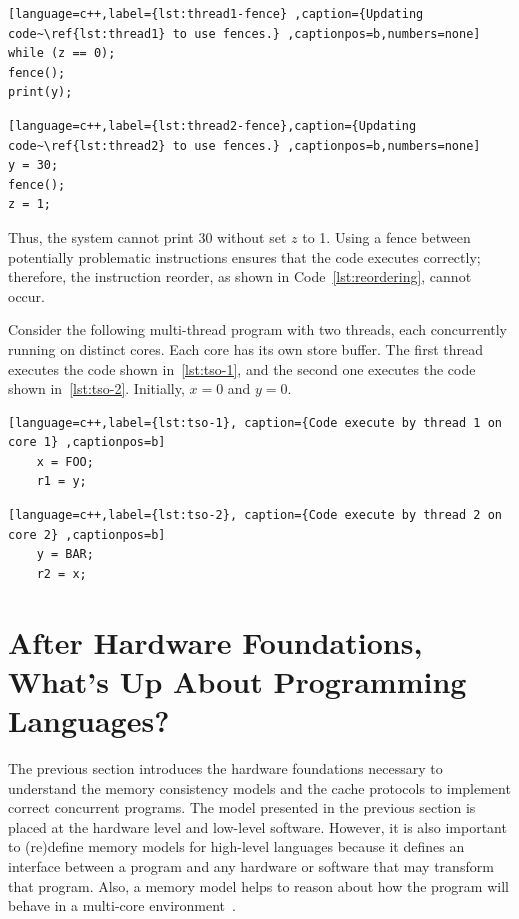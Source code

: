 \begin{example}
\begin{lstlisting}[language=c++,label={lst:thread1-fence} ,caption={Updating code~\ref{lst:thread1} to use fences.} ,captionpos=b,numbers=none]
while (z == 0);
fence();
print(y);
\end{lstlisting}

\begin{lstlisting}[language=c++,label={lst:thread2-fence},caption={Updating code~\ref{lst:thread2} to use fences.} ,captionpos=b,numbers=none]
y = 30;
fence();
z = 1;
\end{lstlisting}

Thus, the system cannot print 30 without set \(z\) to 1. Using a fence between potentially problematic instructions ensures that the code executes correctly; therefore, the instruction reorder, as shown in Code~\ref{lst:reordering}, cannot occur.
\end{example}




\begin{example}
  \label{ex:tso-problem}

  Consider the following multi-thread program with two threads, each concurrently running on distinct cores. Each core has its own store buffer. The first thread executes the code shown in~\ref{lst:tso-1}, and the second one executes the code shown in~\ref{lst:tso-2}. Initially, \(x = 0\) and \(y = 0\).

  \begin{lstlisting}[language=c++,label={lst:tso-1}, caption={Code execute by thread 1 on core 1} ,captionpos=b]
    x = FOO;
    r1 = y;
\end{lstlisting}

  \begin{lstlisting}[language=c++,label={lst:tso-2}, caption={Code execute by thread 2 on core 2} ,captionpos=b]
    y = BAR;
    r2 = x;
  \end{lstlisting}



\end{example}




\section{After Hardware Foundations, What's Up About Programming Languages?}

The previous section introduces the hardware foundations necessary to understand the memory consistency models and the cache protocols to implement correct concurrent programs. The model presented in the previous section is placed at the hardware level and low-level software. However, it is also important to (re)define memory models for high-level languages because it defines an interface between a program and any hardware or software that may transform that program. Also, a memory model helps to reason about how the program will behave in a multi-core environment~\cite{DBLP_journals_cacm_AdveB10, DBLP_series_synthesis_2020Nagarajan}.


